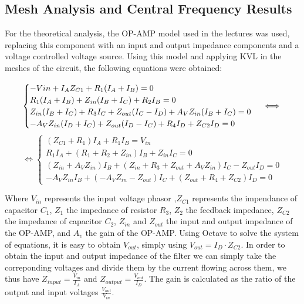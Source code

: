 \subsection{Mesh Analysis and Central Frequency Results}
\hspace{12pt} For the theoretical analysis, the OP-AMP model used in the lectures was used, replacing this component with an input and output impedance components and a voltage controlled voltage source. Using this model and applying KVL in the meshes of the circuit, the following equations were obtained:

\vspace{20pt}
\begin{equation}	
    \begin{cases}
        -Vin+I_AZ_{C1}+R_1(I_A+I_B)=0 \\
        R_1(I_A+I_B)+Z_{in}(I_B+I_C)+R_2I_B=0 \\
        Z_{in}(I_B+I_C)+R_3I_C+Z_{out}(I_C-I_D)+A_VZ_{in}(I_B+I_C)=0 \\
        -A_VZ_{in}(I_D+I_C)+Z_{out}(I_D-I_C)+R_4I_D+Z_{C2}I_D=0
    \end{cases}
    \iff \\
\end{equation}
\vspace{20pt}
\begin{equation}
    \iff
    \begin{cases}
        (Z_{C1}+R_1)I_A+R_1I_B=V_{in} \\
        R_1I_A+(R_1+R_2+Z_{in})I_B+Z_{in}I_C=0 \\
        (Z_{in}+A_VZ_{in})I_B+(Z_{in}+R_3+Z_{out}+A_VZ_{in})I_C-Z_{out}I_D=0 \\
        -A_VZ_{in}I_B+(-A_VZ_{in}-Z_{out})I_C+(Z_{out}+R_4+Z_{C2})I_D=0
    \end{cases}
    \nonumber
\end{equation}
\vspace{30pt}

Where $V_{in}$ represents the input voltage phasor ,$Z_{C1}$ represents the impendance of capacitor $C_1$, $Z_1$ the impedance of resistor $R_3$, $Z_2$ the feedback impedance, $Z_{C2}$ the impedance of capacitor $C_2$, $Z_{in}$ and $Z_{out}$ the input and output impedance of the OP-AMP, and $A_v$ the gain of the OP-AMP.
Using Octave to solve the system of equations, it is easy to obtain $V_{out}$, simply using $V_{out}=I_D \cdot Z_{C2}$. In order to obtain the input and output impedance of the filter we can simply take the correponding voltages and divide them by the current flowing across them, we thus have $Z_{input} = \frac{V_{in}}{I_A}$ and $Z_{output} = \frac{V_{out}}{I_D}$. The gain is calculated as the ratio of the output and input voltages $\frac{V_{out}}{V_{in}}$.
\vspace{30pt}

